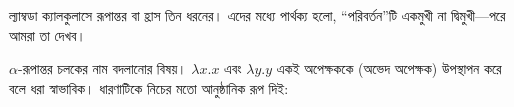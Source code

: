 \documentclass[../../../include/open-logic-section]{subfiles}
\begin{document}

ল্যাম্বডা ক্যালকুলাসে রূপান্তর বা হ্রাস তিন ধরনের। এদের মধ্যে পার্থক্য
হলো, ``পরিবর্তন''টি একমুখী না দ্বিমুখী—পরে আমরা তা দেখব।

$\alpha$-রূপান্তর চলকের নাম বদলানোর বিষয়। $\lambda x. x$ এবং
$\lambda y.y$ একই অপেক্ষককে (অভেদ অপেক্ষক) উপস্থাপন করে বলে ধরা
স্বাভাবিক। ধারণাটিকে নিচের মতো আনুষ্ঠানিক রূপ দিই:
\end{document}
